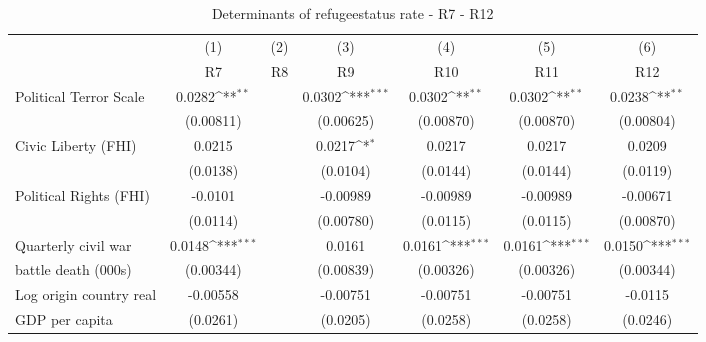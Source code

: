 \begin{table}[!ht]\centering \scriptsize
	\def\sym#1{\ifmmode^{#1}\else\(^{#1}\)\fi}
	\caption{Determinants of refugeestatus rate - R7 - R12}
	\begin{tabular}{l*{6}{c}}
		\hline\hline
		&\multicolumn{1}{c}{(1)}     &\multicolumn{1}{c}{(2)}       &\multicolumn{1}{c}{(3)}       &\multicolumn{1}{c}{(4)}    	&\multicolumn{1}{c}{(5)}  	&\multicolumn{1}{c}{(6)}   \\
		&\multicolumn{1}{c}{R7}&\multicolumn{1}{c}{R8}&\multicolumn{1}{c}{R9}&\multicolumn{1}{c}{R10}&\multicolumn{1}{c}{R11}&\multicolumn{1}{c}{R12}\\ 
\hline
Political Terror Scale&      0.0282\sym{**} &                     &      0.0302\sym{***}&      0.0302\sym{**} &      0.0302\sym{**} &      0.0238\sym{**} \\
                    &   (0.00811)         &                     &   (0.00625)         &   (0.00870)         &   (0.00870)         &   (0.00804)         \\
[0,5em]
Civic Liberty (FHI) &      0.0215         &                     &      0.0217\sym{*}  &      0.0217         &      0.0217         &      0.0209         \\
                    &    (0.0138)         &                     &    (0.0104)         &    (0.0144)         &    (0.0144)         &    (0.0119)         \\
[0,5em]
Political Rights (FHI)&     -0.0101         &                     &    -0.00989         &    -0.00989         &    -0.00989         &    -0.00671         \\
                    &    (0.0114)         &                     &   (0.00780)         &    (0.0115)         &    (0.0115)         &   (0.00870)         \\
[0,5em]
Quarterly civil war &      0.0148\sym{***}&                     &      0.0161         &      0.0161\sym{***}&      0.0161\sym{***}&      0.0150\sym{***}\\
battle death (000s)                    &   (0.00344)         &                     &   (0.00839)         &   (0.00326)         &   (0.00326)         &   (0.00344)         \\
[0,5em]
Log origin country real &    -0.00558         &                     &    -0.00751         &    -0.00751         &    -0.00751         &     -0.0115         \\
GDP per capita                    &    (0.0261)         &                     &    (0.0205)         &    (0.0258)         &    (0.0258)         &    (0.0246)         \\

\end{tabular}
\end{table}
